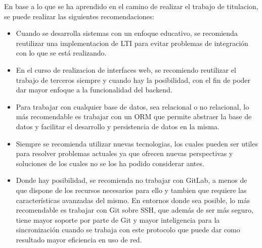 En base a lo que se ha aprendido en el camino de realizar el trabajo de titulacion, se puede realizar las siguientes recomendaciones:

\begin{itemize}
  \item Cuando se desarrolla sistemas con un enfoque educativo, se recomienda reutilizar una implementacion de LTI para evitar problemas de integración con lo que se está realizando.
  \item En el curso de realizacion de interfaces web, se recomiendo reutilizar el trabajo de terceros siempre y cuando hay la posibilidad, con el fin de poder dar mayor enfoque a la funcionalidad del backend.
  \item Para trabajar con cualquier base de datos, sea relacional o no relacional, lo más recomendable es trabajar con un ORM que permite abstraer la base de datos y facilitar el desarrollo y persistencia de datos en la misma.
  \item Siempre se recomienda utilizar nuevas tecnologias, los cuales pueden ser utiles para resolver problemas actuales ya que ofrecen nuevas perspectivas y soluciones de los cuales no se los ha podido considerar antes.
  \item Donde hay posibilidad, se recomienda no trabajar con GitLab, a menos de que dispone de los recursos necesarios para ello y tambien que requiere las características avanzadas del mismo. En entornos donde sea posible, lo más recomendable es trabajar con Git sobre SSH, que además de ser más seguro, tiene mayor soporte por parte de Git y mayor inteligencia para la sincronización cuando se trabaja con este protocolo que puede dar como resultado mayor eficiencia en uso de red.
\end{itemize}



